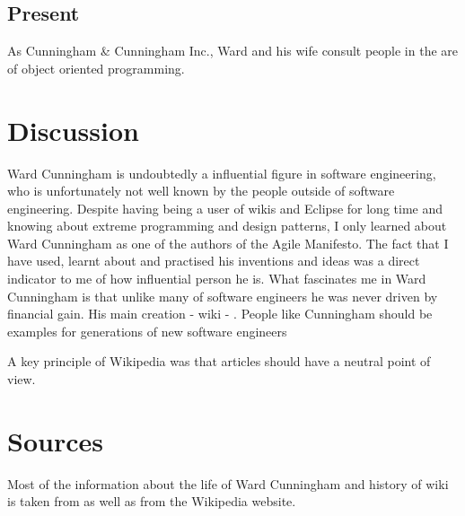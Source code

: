 \documentclass[11pt]{article}
\begin{document}
\subsection{Present}
As Cunningham  \& Cunningham  Inc., Ward and  his  wife consult people in the are of object oriented programming.

\section{Discussion}
Ward Cunningham is undoubtedly a influential figure in software engineering, who is unfortunately not well known by the people outside of software engineering. Despite having being a user of wikis and Eclipse for long time and knowing about extreme programming and design patterns, I only learned about Ward Cunningham as one of the authors of the Agile Manifesto. The fact that I have used, learnt about and practised his inventions and ideas was a direct indicator to me of how influential person he is.
What fascinates me in Ward Cunningham is that unlike many of software engineers he was never driven by financial gain. His main creation - wiki - .
People like Cunningham should be examples for generations of new software engineers


A key principle of Wikipedia was that articles should have a neutral point of view.

\section{Sources}
Most of the information about the life of Ward Cunningham and history of wiki is taken from \cite{innovators} \cite{wiki-revolution} \cite{cs-encyclopedia} as well as from the Wikipedia website.

%

 
\end{document}
